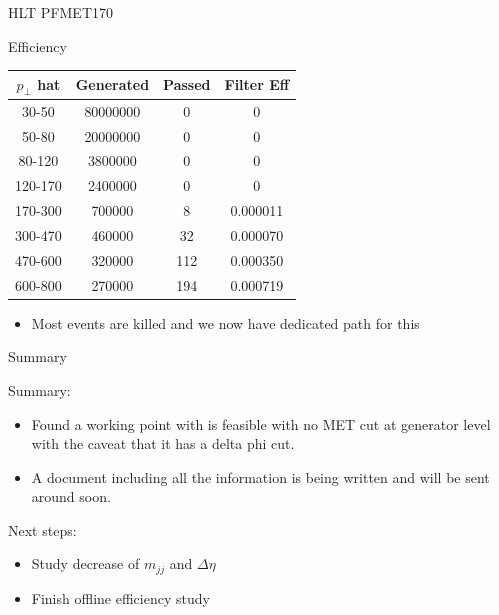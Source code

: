 \documentclass[8pt]{beamer}
\begin{document}
\begin{frame}{HLT PFMET170}

\begin{block}{Efficiency}

\centering
\begin{tabular}{|c||c|c|c|}
\hline
$p_\perp$ hat & Generated & Passed & Filter Eff  \\
\hline
\hline                                   
  30-50 &   80000000    &   0 & 0        \\
  50-80 &   20000000    &   0 & 0        \\
 80-120 &      3800000  &   0 & 0        \\
120-170 & 2400000       &   0 & 0        \\
170-300 &  700000       &   8 & 0.000011 \\
300-470 &   460000      &  32 & 0.000070 \\
470-600 &   320000      & 112 & 0.000350 \\
600-800 &      270000   & 194 & 0.000719 \\
\hline
\hline
\end{tabular}

\end{block}
  
\begin{itemize}
  \item Most events are killed and we now have dedicated path for this
\end{itemize}
  
\end{frame}


\begin{frame}{Summary}
 
\begin{block}{Summary:}
 
\begin{itemize}
  \item Found a working point with is feasible with no MET cut at generator level with the caveat that it has a delta phi cut.
  \item A document including all the information is being written and will be sent around soon.
\end{itemize}

\end{block}

\begin{block}{Next steps:}
 
\begin{itemize}
  \item Study decrease of $m_{jj}$ and $\Delta\eta$
  \item Finish offline efficiency study
\end{itemize}

\end{block}

\end{frame}
\end{document}
